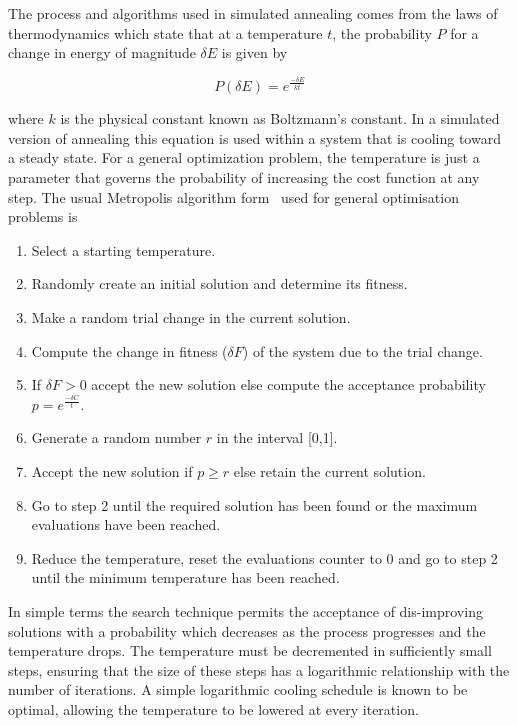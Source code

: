 The process and algorithms used in simulated annealing comes from the laws of thermodynamics which state that at a temperature $t$, the probability $P$ for a change  in energy of magnitude $\delta E$ is given by 

\large
\begin{displaymath}
P(\delta E) = e ^{ \frac{-\delta E}{kt}}
\end{displaymath}
\normalsize

\par\noindent where $k$ is the physical constant known as Boltzmann's constant. In a simulated version of annealing this equation is used within a system that is cooling toward a steady  state. 
For a general optimization problem, the temperature is just a parameter that governs the probability of increasing the cost function at any step. The usual Metropolis algorithm form~\cite{rosenbluth}  used  for general optimisation problems is 
\label{sa_algorithm}
\begin{center}
\begin{enumerate}
\item Select a starting temperature. 
\item Randomly create an initial solution and determine its fitness. 
\item Make a random trial change in the current solution. 
\item Compute the change in fitness ($\delta F$) of the system due to the trial change. 
\item If $\delta F > 0 $ accept the new solution else compute the acceptance probability $p = e^{\frac{-\delta C}{t}}$. 
\item Generate a random number $r$ in the interval [0,1]. 
\item Accept the new solution if $ p \ge r$ else  retain the current solution. 
\item Go to step 2 until the required solution has been found or the maximum evaluations have been reached.
\item Reduce the temperature, reset the evaluations counter to 0  and go to step 2 until the minimum temperature has been reached. 
\end{enumerate}
\end{center}

\par\noindent In simple terms the search technique permits the acceptance of dis-improving solutions with a probability which decreases as the process progresses and the temperature drops. The temperature must be decremented in sufficiently small steps, ensuring that the size of these steps has a logarithmic relationship with the number of iterations. A simple logarithmic cooling schedule is known to be optimal, allowing the temperature to be lowered at every iteration.


